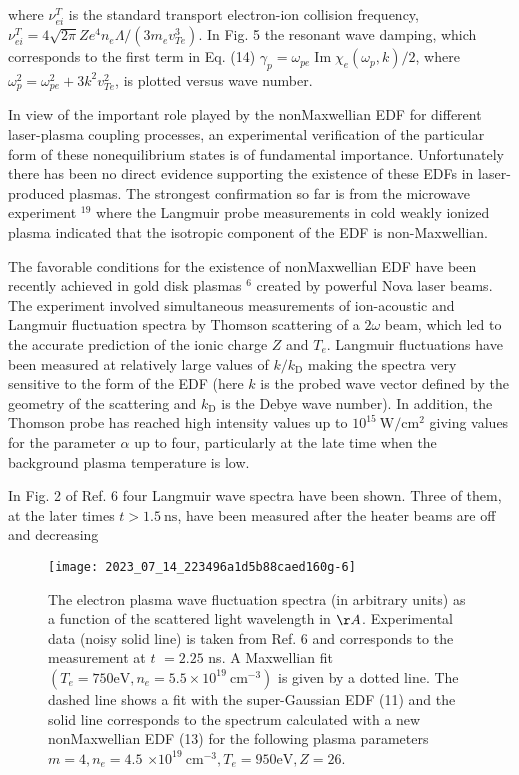 \documentclass[oneside,onecolumn]{article}
\begin{document}
\begin{sloppypar}
 where $\nu_{e i}^{T}$ is the standard transport electron-ion collision frequency, $\nu_{e i}^{T}=4 \sqrt{2 \pi} Z e^{4} n_{e} \Lambda /\left(3 m_{e} v_{T e}^{3}\right)$. In Fig. 5 the resonant wave damping, which corresponds to the first term in Eq. (14) $\gamma_{p}=\omega_{p e} \operatorname{Im} \chi_{e}\left(\omega_{p}, k\right) / 2$, where $\omega_{p}^{2}=\omega_{p e}^{2}+3 k^{2} v_{T e}^{2}$, is plotted versus wave number.
 
 In view of the important role played by the nonMaxwellian EDF for different laser-plasma coupling processes, an experimental verification of the particular form of these nonequilibrium states is of fundamental importance. Unfortunately there has been no direct evidence supporting the existence of these EDFs in laser-produced plasmas. The strongest confirmation so far is from the microwave experiment $^{19}$ where the Langmuir probe measurements in cold weakly ionized plasma indicated that the isotropic component of the EDF is non-Maxwellian.
 
 The favorable conditions for the existence of nonMaxwellian EDF have been recently achieved in gold disk plasmas ${ }^{6}$ created by powerful Nova laser beams. The experiment involved simultaneous measurements of ion-acoustic and Langmuir fluctuation spectra by Thomson scattering of a $2 \omega$ beam, which led to the accurate prediction of the ionic charge $Z$ and $T_{e}$. Langmuir fluctuations have been measured at relatively large values of $k / k_{\mathrm{D}}$ making the spectra very sensitive to the form of the EDF (here $k$ is the probed wave vector defined by the geometry of the scattering and $k_{\mathrm{D}}$ is the Debye wave number). In addition, the Thomson probe has reached high intensity values up to $10^{15} \mathrm{~W} / \mathrm{cm}^{2}$ giving values for the parameter $\alpha$ up to four, particularly at the late time when the background plasma temperature is low.
 
 In Fig. 2 of Ref. 6 four Langmuir wave spectra have been shown. Three of them, at the later times $t>1.5 \mathrm{~ns}$, have been measured after the heater beams are off and decreasing
 
 \begin{figure}[tbp]
 	\centering
 	\texttt{[image: 2023\_07\_14\_223496a1d5b88caed160g-6]}
 	\caption{The electron plasma wave fluctuation spectra (in arbitrary units) as a function of the scattered light wavelength in $\AA$. Experimental data (noisy solid line) is taken from Ref. 6 and corresponds to the measurement at $t$ $=2.25$ ns. A Maxwellian fit $\left(T_{e}=750 \mathrm{eV}, n_{e}=5.5 \times 10^{19} \mathrm{~cm}^{-3}\right)$ is given by a dotted line. The dashed line shows a fit with the super-Gaussian EDF (11) and the solid line corresponds to the spectrum calculated with a new nonMaxwellian EDF (13) for the following plasma parameters $m=4, n_{e}=4.5$ $\times 10^{19} \mathrm{~cm}^{-3}, T_{e}=950 \mathrm{eV}, Z=26$.}
 	\label{fig6.}
 \end{figure}
 

\end{sloppypar}
\end{document}
